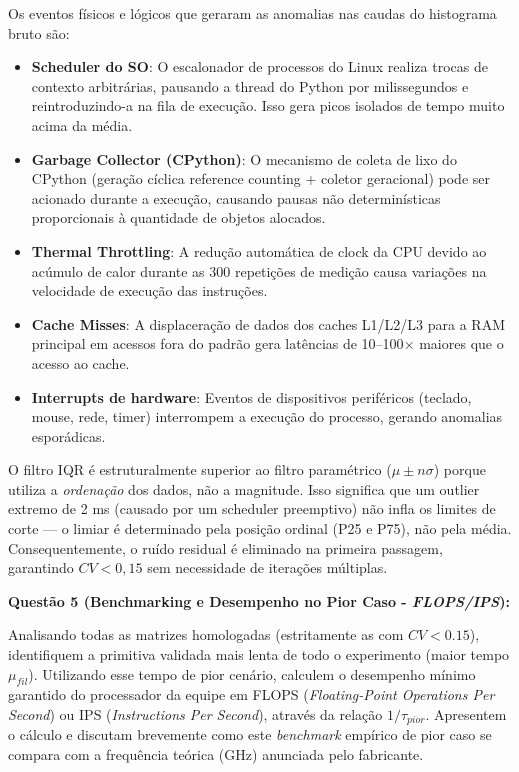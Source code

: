\documentclass[12pt,a4paper]{article}
\begin{document}
Os eventos físicos e lógicos que geraram as anomalias nas caudas do histograma bruto são:
\begin{itemize}[leftmargin=0.8cm,itemsep=0.15cm]
    \item \textbf{Scheduler do SO}: O escalonador de processos do Linux realiza trocas de contexto arbitrárias, pausando a thread do Python por milissegundos e reintroduzindo-a na fila de execução. Isso gera picos isolados de tempo muito acima da média.
    \item \textbf{Garbage Collector (CPython)}: O mecanismo de coleta de lixo do CPython (geração cíclica reference counting + coletor geracional) pode ser acionado durante a execução, causando pausas não determinísticas proporcionais à quantidade de objetos alocados.
    \item \textbf{Thermal Throttling}: A redução automática de clock da CPU devido ao acúmulo de calor durante as 300 repetições de medição causa variações na velocidade de execução das instruções.
    \item \textbf{Cache Misses}: A displaceração de dados dos caches L1/L2/L3 para a RAM principal em acessos fora do padrão gera latências de 10--100$\times$ maiores que o acesso ao cache.
    \item \textbf{Interrupts de hardware}: Eventos de dispositivos periféricos (teclado, mouse, rede, timer) interrompem a execução do processo, gerando anomalias esporádicas.
\end{itemize}

O filtro IQR é estruturalmente superior ao filtro paramétrico ($\mu \pm n\sigma$) porque utiliza a \textit{ordenação} dos dados, não a magnitude. Isso significa que um outlier extremo de 2 ms (causado por um scheduler preemptivo) não infla os limites de corte — o limiar é determinado pela posição ordinal (P25 e P75), não pela média. Consequentemente, o ruído residual é eliminado na primeira passagem, garantindo $CV < 0,15$ sem necessidade de iterações múltiplas.

\vspace{0.55cm}

\textbf{Questão 5 (Benchmarking e Desempenho no Pior Caso - \textit{FLOPS/IPS}):}

Analisando todas as matrizes homologadas (estritamente as com $CV<0.15$), identifiquem a primitiva
validada mais lenta de todo o experimento (maior tempo $\mu_{fil}$). Utilizando esse tempo de pior cenário,
calculem o desempenho mínimo garantido do processador da equipe em FLOPS (\textit{Floating-Point Operations
Per Second}) ou IPS (\textit{Instructions Per Second}), através da relação $1/\tau_{pior}$. Apresentem o cálculo
e discutam brevemente como este \textit{benchmark} empírico de pior caso se compara com a frequência
teórica (GHz) anunciada pelo fabricante.
\end{document}
